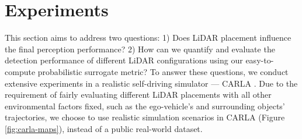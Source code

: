 \documentclass[10pt,twocolumn,letterpaper]{article}
\newcommand{\todo}[1]{\hl{[#1]}}
\begin{document}
\section{Experiments}
\label{experiments}
This section aims to address two questions: 1) Does LiDAR placement influence the final perception performance? 2) How can we quantify and evaluate the detection performance of different LiDAR configurations using our easy-to-compute probabilistic surrogate metric? To answer these questions, we conduct extensive experiments in a realistic self-driving simulator --- CARLA \cite{dosovitskiy2017carla}. Due to the requirement of fairly evaluating different LiDAR placements with all other environmental factors fixed, such as the ego-vehicle's and surrounding objects' trajectories,
we choose to use realistic simulation scenarios in CARLA (Figure \ref{fig:carla-maps}), instead of a public real-world dataset.


\end{document}
